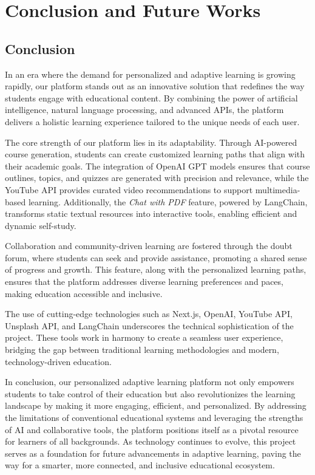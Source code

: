 
\chapter{Conclusion and Future Works} %

\label{Chapter5} %

\section{Conclusion}
In an era where the demand for personalized and adaptive learning is growing rapidly, our platform stands out as an innovative solution that redefines the way students engage with educational content. By combining the power of artificial intelligence, natural language processing, and advanced APIs, the platform delivers a holistic learning experience tailored to the unique needs of each user.

The core strength of our platform lies in its adaptability. Through AI-powered course generation, students can create customized learning paths that align with their academic goals. The integration of OpenAI GPT models ensures that course outlines, topics, and quizzes are generated with precision and relevance, while the YouTube API provides curated video recommendations to support multimedia-based learning. Additionally, the \textit{Chat with PDF} feature, powered by LangChain, transforms static textual resources into interactive tools, enabling efficient and dynamic self-study.

Collaboration and community-driven learning are fostered through the doubt forum, where students can seek and provide assistance, promoting a shared sense of progress and growth. This feature, along with the personalized learning paths, ensures that the platform addresses diverse learning preferences and paces, making education accessible and inclusive.

The use of cutting-edge technologies such as Next.js, OpenAI, YouTube API, Unsplash API, and LangChain underscores the technical sophistication of the project. These tools work in harmony to create a seamless user experience, bridging the gap between traditional learning methodologies and modern, technology-driven education.

In conclusion, our personalized adaptive learning platform not only empowers students to take control of their education but also revolutionizes the learning landscape by making it more engaging, efficient, and personalized. By addressing the limitations of conventional educational systems and leveraging the strengths of AI and collaborative tools, the platform positions itself as a pivotal resource for learners of all backgrounds. As technology continues to evolve, this project serves as a foundation for future advancements in adaptive learning, paving the way for a smarter, more connected, and inclusive educational ecosystem.

